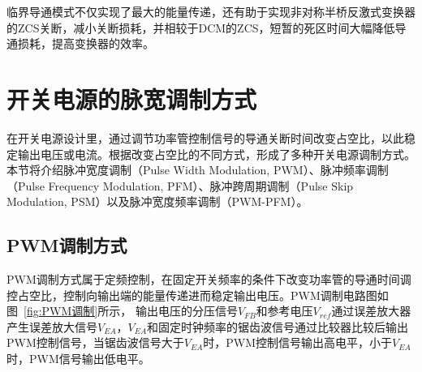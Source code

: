临界导通模式不仅实现了最大的能量传递，还有助于实现非对称半桥反激式变换器的ZCS关断，减小关断损耗，并相较于DCM的ZCS，短暂的死区时间大幅降低导通损耗，提高变换器的效率。








\section{开关电源的脉宽调制方式}

在开关电源设计里，通过调节功率管控制信号的导通关断时间改变占空比，以此稳定输出电压或电流。根据改变占空比的不同方式，形成了多种开关电源调制方式。本节将介绍脉冲宽度调制（Pulse Width Modulation, PWM）、脉冲频率调制（Pulse Frequency Modulation, PFM）、脉冲跨周期调制（Pulse Skip Modulation, PSM）以及脉冲宽度频率调制（PWM-PFM）。


\subsection{PWM调制方式}

PWM调制方式属于定频控制，在固定开关频率的条件下改变功率管的导通时间调控占空比，控制向输出端的能量传递进而稳定输出电压。PWM调制电路图如图~\ref{fig:PWM调制}所示，
输出电压的分压信号$V_{FB}$和参考电压$V_{ref}$通过误差放大器产生误差放大信号$V_{EA}$，$V_{EA}$和固定时钟频率的锯齿波信号通过比较器比较后输出PWM控制信号，当锯齿波信号大于$V_{EA}$时，PWM控制信号输出高电平，小于$V_{EA}$时，PWM信号输出低电平。


